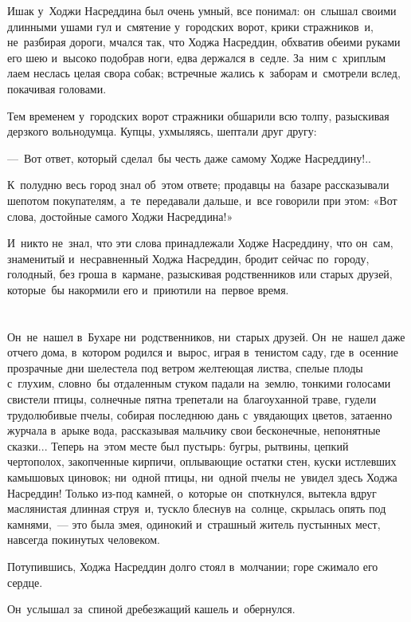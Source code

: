 \documentclass[12pt,a4paper]{book}
\begin{document}
Ишак у~Ходжи Насреддина был очень умный, все понимал: он~слышал своими длинными ушами гул и~смятение у~городских ворот, крики стражников~и, не~разбирая дороги, мчался так, что Ходжа Насреддин, обхватив обеими руками его шею и~высоко подобрав ноги, едва держался в~седле. За~ним с~хриплым лаем неслась целая свора собак; встречные жались к~заборам и~смотрели вслед, покачивая головами.

Тем временем у~городских ворот стражники обшарили всю толпу, разыскивая дерзкого вольнодумца. Купцы, ухмыляясь, шептали друг другу:

—~Вот ответ, который сделал~бы честь даже самому Ходже Насреддину!..

К~полудню весь город знал об~этом ответе; продавцы на~базаре рассказывали шепотом покупателям, а~те~передавали дальше, и~все говорили при этом: «Вот слова, достойные самого Ходжи Насреддина!»

И~никто не~знал, что эти слова принадлежали Ходже Насреддину, что он~сам, знаменитый и~несравненный Ходжа Насреддин, бродит сейчас по~городу, голодный, без гроша в~кармане, разыскивая родственников или старых друзей, которые~бы накормили его и~приютили на~первое время.


\chapter{}

Он~не~нашел в~Бухаре ни~родственников, ни~старых друзей. Он~не~нашел даже отчего дома, в~котором родился и~вырос, играя в~тенистом саду, где в~осенние прозрачные дни шелестела под ветром желтеющая листва, спелые плоды с~глухим, словно~бы отдаленным стуком падали на~землю, тонкими голосами свистели птицы, солнечные пятна трепетали на~благоуханной траве, гудели трудолюбивые пчелы, собирая последнюю дань с~увядающих цветов, затаенно журчала в~арыке вода, рассказывая мальчику свои бесконечные, непонятные сказки... Теперь на~этом месте был пустырь: бугры, рытвины, цепкий чертополох, закопченные кирпичи, оплывающие остатки стен, куски истлевших камышовых циновок; ни~одной птицы, ни~одной пчелы не~увидел здесь Ходжа Насреддин! Только из-под камней, о~которые он~споткнулся, вытекла вдруг маслянистая длинная струя~и, тускло блеснув на~солнце, скрылась опять под камнями,~— это была змея, одинокий и~страшный житель пустынных мест, навсегда покинутых человеком.

Потупившись, Ходжа Насреддин долго стоял в~молчании; горе сжимало его сердце.

Он~услышал за~спиной дребезжащий кашель и~обернулся.
\end{document}
